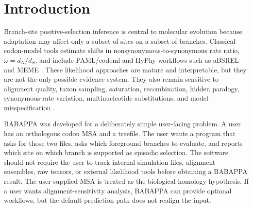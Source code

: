 \documentclass[11pt,a4paper]{article}
\begin{document}
\begin{abstract}
A close-taxa WRKY pilot demonstrates the present empirical behavior. \texttt{WRKY\_candidate\_01} was rejected as an out-of-domain stress test with mean p-distance 0.725799. \texttt{WRKY\_candidate\_02\_close}, a seven-taxon close Brassicaceae WRKY33/AT2G38470 panel, was in-domain and BABAPPA diagnostic-positive, with max gene support 0.177189 and 6,954 called branch-site rows. codeml and HyPhy comparators were negative, while a 100-replicate feature-level BABAPPA matched-null calibration showed unusual called-row burden but not unusual maximum gene support. The result is therefore BABAPPA-only with mixed native-null support, not a cross-method biological discovery claim. The manuscript presents BABAPPA as a standalone complementary method whose outputs can be reported as BABAPPA-native calibrated branch-site support when QC, applicability, calibration, and biological context are documented.
\end{abstract}

\section{Introduction}

Branch-site positive-selection inference is central to molecular evolution because adaptation may affect only a subset of sites on a subset of branches. Classical codon-model tools estimate shifts in nonsynonymous-to-synonymous rate ratio, $\omega=d_N/d_S$, and include PAML/codeml and HyPhy workflows such as aBSREL and MEME \citep{muse1994,goldman1994,yang2007,zhang2005,pond2011_bsrel,smith2015_absrel,murrell2012_meme,murrell2015_busted,pond2020_hyphy}. These likelihood approaches are mature and interpretable, but they are not the only possible evidence system. They also remain sensitive to alignment quality, taxon sampling, saturation, recombination, hidden paralogy, synonymous-rate variation, multinucleotide substitutions, and model misspecification \citep{anisimova2003_recombination,scheffler2006_recombination,jordan2012_alignment,redelings2014_erasing,venkat2018_mnm,dunn2019_mnm,wisotsky2020_srv,lucaci2023_mhs,duchene2022_saturation}.

BABAPPA was developed for a deliberately simple user-facing problem. A user has an orthologous codon MSA and a treefile. The user wants a program that asks for those two files, asks which foreground branches to evaluate, and reports which site on which branch is supported as episodic selection. The software should not require the user to track internal simulation files, alignment ensembles, raw tensors, or external likelihood tools before obtaining a BABAPPA result. The user-supplied MSA is treated as the biological homology hypothesis. If a user wants alignment-sensitivity analysis, BABAPPA can provide optional workflows, but the default prediction path does not realign the input.
\end{document}
